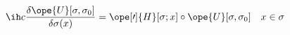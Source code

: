\begin{equation}	\label{12.16}
\ih c \frac{\delta\ope{U}[\sigma,\sigma_0]}{\delta\sigma(x)}
=
\ope[\prime]{H}[\sigma;x]\circ \ope{U}[\sigma,\sigma_0]
\quad
x\in\sigma
	\end{equation}


